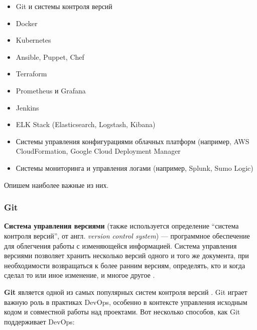 \documentclass[referat]{SCWorks}
\begin{document}
\begin{itemize}
\item Git и системы контроля версий
\item Docker
\item Kubernetes
\item Ansible, Puppet, Chef
\item Terraform
\item Prometheus и Grafana
\item Jenkins
\item ELK Stack (Elasticsearch, Logstash, Kibana)
\item Системы управления конфигурациями облачных платформ (например, AWS CloudFormation, Google Cloud Deployment Manager
\item Системы мониторинга и управления логами (например, Splunk, Sumo Logic)
\end{itemize}

Опишем наиболее важные из них.

\subsubsection{Git}

\textbf{Система управления версиями} (также используется определение ``система контроля версий'', от англ. \textit{version control system}) — программное обеспечение для облегчения работы с изменяющейся информацией. Система управления версиями позволяет хранить несколько версий одного и того же документа, при необходимости возвращаться к более ранним версиям, определять, кто и когда сделал то или иное изменение, и многое другое \cite{VCS_Wiki}.

\textbf{Git} является одной из самых популярных систем контроля версий \cite{GitStat}. Git играет важную роль в практиках DevOps, особенно в контексте управления исходным кодом и совместной работы над проектами. Вот несколько способов, как Git поддерживает DevOps:
\end{document}
